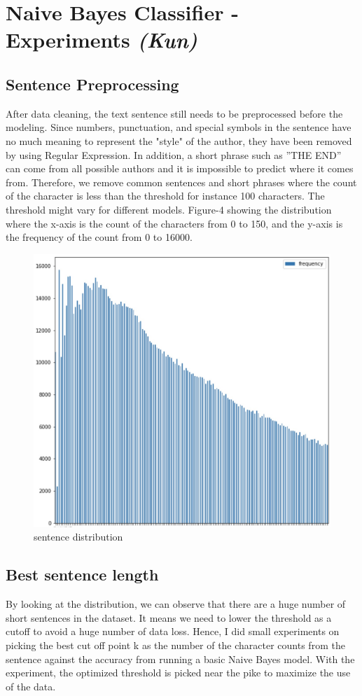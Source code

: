 \documentclass[journal,12pt,onecolumn]{IEEEtran}
\begin{document}
\section{Naive Bayes Classifier - Experiments \textit{(Kun)}}

\subsection{Sentence Preprocessing}
After data cleaning, the text sentence still needs to be preprocessed before the modeling. Since numbers, punctuation, and special symbols in the sentence have no much meaning to represent the "style" of the author, they have been removed by using Regular Expression. In addition, a short phrase such as ”THE END” can come from all possible authors and it is impossible to predict where it comes from. Therefore, we remove common sentences and short phrases where the count of the character is less than the threshold for instance 100 characters. The threshold might vary for different models. Figure-4 showing the distribution where the x-axis is the count of the characters from 0 to 150, and the y-axis is the frequency of the count from 0 to 16000.

\begin{figure}[h]
    \centering
    \includegraphics[width=0.5\linewidth]{sentence_distribution.jpg}
    \caption{sentence distribution}
    \label{fig:distribution}
\end{figure}

\subsection{Best sentence length}
By looking at the distribution, we can observe that there are a huge number of short sentences in the dataset. It means we need to lower the threshold as a cutoff to avoid a huge number of data loss. Hence, I did small experiments on picking the best cut off point k as the number of the character counts from the sentence against the accuracy from running a basic Naive Bayes model. With the experiment, the optimized threshold is picked near the pike to maximize the use of the data. 
\end{document}
